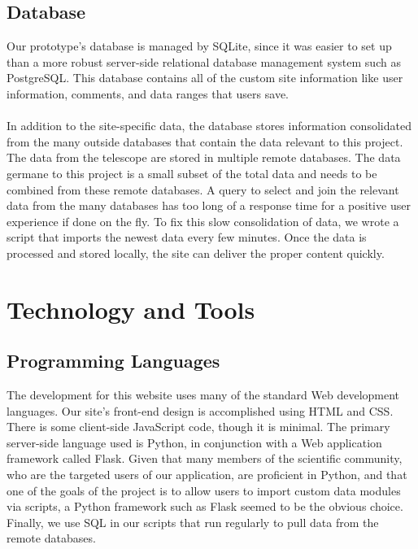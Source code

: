 \documentclass[12pt]{article}
\begin{document}
\begin{spacing}{1.5}
\subsection{Database}
Our prototype's database is managed by SQLite, since it was easier to set up than a more robust server-side relational database management system such as PostgreSQL. This database contains all of the custom site information like user information, comments, and data ranges that users save.
\\ \\
In addition to the site-specific data, the database stores information consolidated from the many outside databases that contain the data relevant to this project. The data from the telescope are stored in multiple remote databases. The data germane to this project is a small subset of the total data and needs to be combined from these remote databases. A query to select and join the relevant data from the many databases has too long of a response time for a positive user experience if done on the fly. To fix this slow consolidation of data, we wrote a script that imports the newest data every few minutes. Once the data is processed and stored locally, the site can deliver the proper content quickly.

\section{Technology and Tools}
\subsection{Programming Languages}
The development for this website uses many of the standard Web development languages. Our site's front-end design is accomplished using HTML and CSS. There is some client-side JavaScript code, though it is minimal. The primary server-side language used is Python, in conjunction with a Web application framework called Flask.  Given that many members of the scientific community, who are the targeted users of our application, are proficient in Python, and that one of the goals of the project is to allow users to import custom data modules via scripts, a Python framework such as Flask seemed to be the obvious choice.  Finally, we use SQL in our scripts that run regularly to pull data from the remote databases.


\end{spacing}
\end{document}
